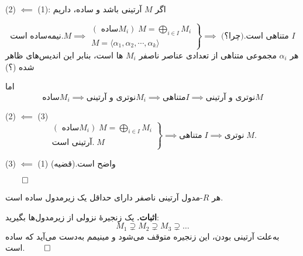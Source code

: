 \begin{frame}
    (2) $\impliedby$ (1): اگر $M$ آرتینی باشد و ساده، داریم

    \[
        \text{نیمه‌ساده است.} M
        \implies
        \left.
        \begin{aligned}
            (\text{ ساده}M_i) \;M = \bigoplus_{i\in I} M_i \\
            M = \langle \alpha_1,\alpha_2, \cdots , \alpha_k \rangle
        \end{aligned}
        \right\}
        \implies
        \text{ متناهی است.(چرا؟)  } I
    \]
    هر
    \(\alpha_i\)
    مجموعی متناهی از تعدادی عناصر ناصفر
    \(M_i\)
    ها است، بنابر این اندیس‌های ظاهر شده (؟)

    اما
    \[
        \text{ساده} M_i \implies \text{نوتری و آرتینی} M_i \implies \text{متناهی} I \implies \text{نوتری و آرتینی} M
    \]
\end{frame}
\begin{frame}
    (2) \(\impliedby\) (3)
    \[
        \left.
        \begin{aligned}
            (\text{ ساده}M_i) \;M = \bigoplus_{i\in I} M_i \\
            \text{آرتینی است.} \;M
        \end{aligned}
        \right\}
        \implies
        \text{متناهی} \; I
        \implies
        \text{نوتری} \; M.
    \]

    (3) \(\impliedby\) (1)
    واضح است.(قضیه)

    \hfill
    \(\qed\)
\end{frame}


\begin{frame}
    \begin{theorem}
        هر $R$-مدول آرتینی ناصفر دارای حداقل یک زیرمدول ساده است.
    \end{theorem}
    \textbf{اثبات.} یک زنجیرهٔ نزولی از زیرمدول‌ها بگیرید:
    \[
        M_1 \supsetneq M_2 \supsetneq M_3 \supsetneq \dots
    \]
    به‌علت آرتینی بودن، این زنجیره متوقف می‌شود و مینیمم به‌دست می‌آید که ساده است.
    \hfill
    \(\qed\)
\end{frame}



